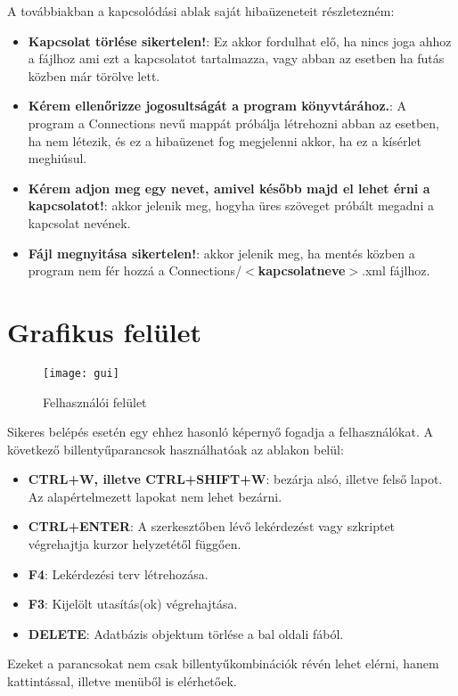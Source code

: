 A továbbiakban a kapcsolódási ablak saját hibaüzeneteit részletezném:
\begin{itemize}
  \item \textbf{Kapcsolat törlése sikertelen!}: Ez akkor fordulhat elő, ha nincs joga ahhoz a fájlhoz ami
  ezt a kapcsolatot tartalmazza, vagy abban az esetben ha futás közben már törölve lett.
  \item \textbf{Kérem ellenőrizze jogosultságát a program könyvtárához.}: A program a Connections nevű mappát
  próbálja létrehozni abban az esetben, ha nem létezik, és ez a hibaüzenet fog megjelenni akkor, ha ez a kísérlet meghiúsul.
  \item \textbf{Kérem adjon meg egy nevet, amivel később majd el lehet érni a kapcsolatot!}: akkor jelenik meg, hogyha üres
  szöveget próbált megadni a kapcsolat nevének.
  \item \textbf{Fájl megnyitása sikertelen!}: akkor jelenik meg, ha mentés közben a program nem fér hozzá a
  Connections/\textbf{$<$kapcsolatneve$>$}.xml fájlhoz.
\end{itemize}

\newpage

\section{Grafikus felület}
\begin{figure}[ht]
    \texttt{[image: gui]}
 \caption{Felhasználói felület}
\end{figure}
Sikeres belépés esetén egy ehhez hasonló képernyő fogadja a felhasználókat.
A következő billentyűparancsok használhatóak az ablakon belül:
\begin{itemize}
  \item \textbf{CTRL+W, illetve CTRL+SHIFT+W}: bezárja alsó, illetve felső lapot. Az alapértelmezett lapokat nem lehet bezárni.
  \item \textbf{CTRL+ENTER}: A szerkesztőben lévő lekérdezést vagy szkriptet végrehajtja kurzor helyzetétől függően.
  \item \textbf{F4}: Lekérdezési terv létrehozása.
  \item \textbf{F3}: Kijelölt utasítás(ok) végrehajtása.
  \item \textbf{DELETE}: Adatbázis objektum törlése a bal oldali fából.
\end{itemize}

Ezeket a parancsokat nem csak billentyűkombinációk révén lehet elérni, hanem kattintással, illetve menüből is elérhetőek.

